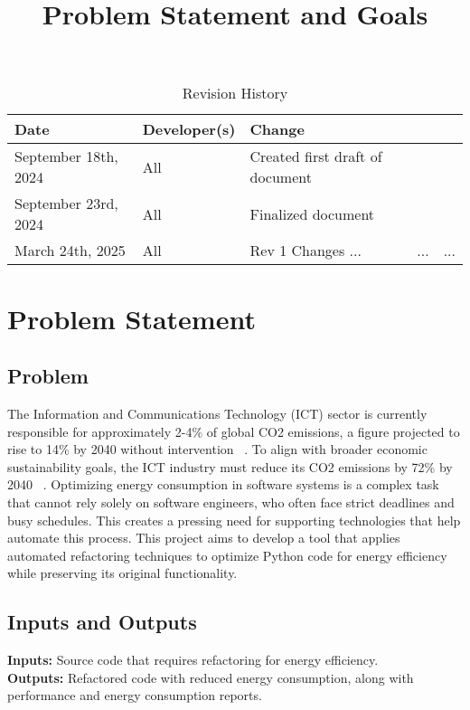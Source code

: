 \documentclass{article}
\title{Problem Statement and Goals\\\progname}
\author{\authname}
\date{}
\begin{document}
\maketitle

\begin{table}[hp]
  \caption{Revision History} \label{TblRevisionHistory}
  \begin{tabularx}{\textwidth}{llX}
    \toprule
    \textbf{Date} & \textbf{Developer(s)} & \textbf{Change}\\
    \midrule
    September 18th, 2024 & All & Created first draft of document\\
    September 23rd, 2024 & All & Finalized document\\
    March 24th, 2025 & All & Rev 1 Changes
    ... & ... & ...\\
    \bottomrule
  \end{tabularx}
\end{table}

\newpage

\section{Problem Statement}

\subsection{Problem}

The Information and Communications Technology (ICT) sector is currently responsible for approximately 2-4\% of global CO2 emissions, a figure projected to rise to 14\% by 2040 without intervention ~\citep{BelkhirAndElmeligi2018}. To align with broader economic sustainability goals, the ICT industry must reduce its CO2 emissions by 72\% by 2040 ~\citep{FreitagAndBernersLee2021}. Optimizing energy consumption in software systems is a complex task that cannot rely solely on software engineers, who often face strict deadlines and busy schedules. This creates a pressing need for supporting technologies that help automate this process. This project aims to develop a tool that applies automated refactoring techniques to optimize Python code for energy efficiency while preserving its original functionality. 

\subsection{Inputs and Outputs}

\textbf{Inputs:} Source code that requires refactoring for energy efficiency. \\
\textbf{Outputs:} Refactored code with reduced energy consumption, along with performance and energy consumption reports.
\end{document}

